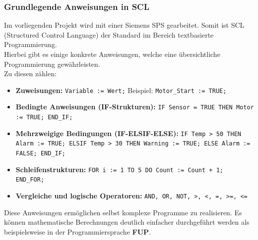 \subsubsection*{Grundlegende Anweisungen in SCL}
Im vorliegenden Projekt wird mit einer Siemens SPS gearbeitet. Somit ist SCL (Structured Control Language) der Standard im Bereich textbasierte Programmierung.\\
Hierbei gibt es einige konkrete Anweisungen, welche eine übersichtliche Programmierung gewährleisten.\\
Zu diesen zählen:
\begin{itemize}
	\item \textbf{Zuweisungen:} \texttt{Variable := Wert;}  
	Beispiel: \texttt{Motor\_Start := TRUE;}
	\item \textbf{Bedingte Anweisungen (IF-Strukturen):}  
	\texttt{IF Sensor = TRUE THEN Motor := TRUE; END\_IF;}
	\item \textbf{Mehrzweigige Bedingungen (IF-ELSIF-ELSE):}  
	\texttt{IF Temp > 50 THEN Alarm := TRUE; ELSIF Temp > 30 THEN Warning := TRUE; ELSE Alarm := FALSE; END\_IF;}
	\item \textbf{Schleifenstrukturen:}  
	\texttt{FOR i := 1 TO 5 DO Count := Count + 1; END\_FOR;}
	\item \textbf{Vergleiche und logische Operatoren:}  
	\texttt{AND, OR, NOT, >, <, =, >=, <=}
\end{itemize}
Diese Anweisungen ermöglichen selbst komplexe Programme zu realisieren. Es können mathematische Berechnungen deutlich einfacher durchgeführt werden als beispielsweise in der Programmiersprache \textbf{FUP}.
